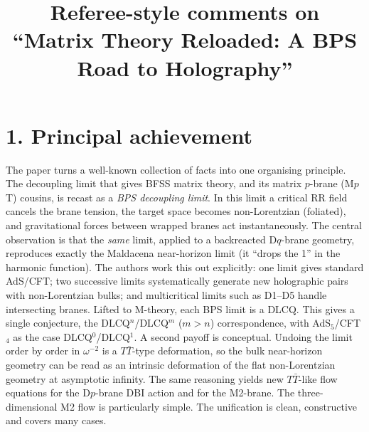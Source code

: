 \documentclass[11pt]{article}
\title{Referee-style comments on\\ ``Matrix Theory Reloaded: A BPS Road to Holography''}
\date{}
\begin{document}
\maketitle

\section*{1. Principal achievement}
The paper turns a well-known collection of facts into one organising principle. The decoupling limit that gives BFSS matrix theory, and its matrix $p$-brane (M$p$T) cousins, is recast as a \emph{BPS decoupling limit}. In this limit a critical RR field cancels the brane tension, the target space becomes non-Lorentzian (foliated), and gravitational forces between wrapped branes act instantaneously. The central observation is that the \emph{same} limit, applied to a backreacted D$q$-brane geometry, reproduces exactly the Maldacena near-horizon limit (it ``drops the 1'' in the harmonic function). The authors work this out explicitly: one limit gives standard AdS/CFT; two successive limits systematically generate new holographic pairs with non-Lorentzian bulks; and multicritical limits such as D1--D5 handle intersecting branes. Lifted to M-theory, each BPS limit is a DLCQ. This gives a single conjecture, the DLCQ$^n$/DLCQ$^m$ ($m>n$) correspondence, with AdS$_5$/CFT$_4$ as the case DLCQ$^0$/DLCQ$^1$. A second payoff is conceptual. Undoing the limit order by order in $\omega^{-2}$ is a $T\bar T$-type deformation, so the bulk near-horizon geometry can be read as an intrinsic deformation of the flat non-Lorentzian geometry at asymptotic infinity. The same reasoning yields new $T\bar T$-like flow equations for the D$p$-brane DBI action and for the M2-brane. The three-dimensional M2 flow is particularly simple. The unification is clean, constructive and covers many cases.
\end{document}

